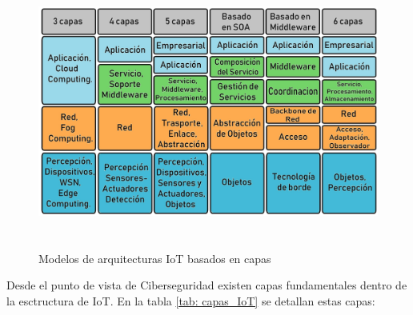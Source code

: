     \begin{figure}[H]
        \centering
        \includegraphics[width=15.6cm, height=9cm]{imagenes/capas.jpg}
        \caption{Modelos de arquitecturas IoT basados en capas}
        \label{imag:modelos_arquitecturas_iot}
    \end{figure}

    Desde el punto de vista de Ciberseguridad \cite{capasIoTciberseguridad} existen capas fundamentales dentro de la esctructura de IoT. En la tabla \ref{tab: capas_IoT} se detallan estas capas:

